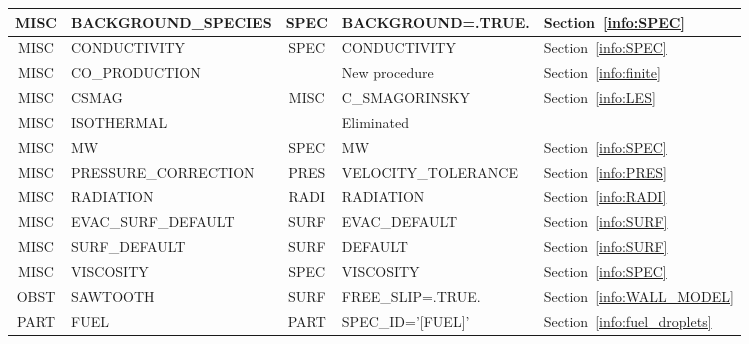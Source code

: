 \documentclass[11pt]{book}
\begin{document}
\begin{table}
\begin{tabular}{@{\extracolsep{\fill}}|c|l|c|l|l|}
{\ct MISC}    & {\ct BACKGROUND\_SPECIES}           &  {\ct SPEC}  & {\ct BACKGROUND=.TRUE.}                     & Section~\ref{info:SPEC}                  \\ \hline
{\ct MISC}    & {\ct CONDUCTIVITY}                  &  {\ct SPEC}  & {\ct CONDUCTIVITY}                          & Section~\ref{info:SPEC}                  \\ \hline
{\ct MISC}    & {\ct CO\_PRODUCTION}                &              & New procedure                               & Section~\ref{info:finite}                \\ \hline
{\ct MISC}    & {\ct CSMAG}                         &  {\ct MISC}  & {\ct C\_SMAGORINSKY}                        & Section~\ref{info:LES}                   \\ \hline
{\ct MISC}    & {\ct ISOTHERMAL}                    &              & Eliminated                                  &                                          \\ \hline
{\ct MISC}    & {\ct MW}                            &  {\ct SPEC}  & {\ct MW}                                    & Section~\ref{info:SPEC}                  \\ \hline
{\ct MISC}    & {\ct PRESSURE\_CORRECTION}          &  {\ct PRES}  & {\ct VELOCITY\_TOLERANCE}                   & Section~\ref{info:PRES}                  \\ \hline
{\ct MISC}    & {\ct RADIATION}                     &  {\ct RADI}  & {\ct RADIATION}                             & Section~\ref{info:RADI}                  \\ \hline
{\ct MISC}    & {\ct EVAC\_SURF\_DEFAULT}           &  {\ct SURF}  & {\ct EVAC\_DEFAULT}                         & Section~\ref{info:SURF}                  \\ \hline
{\ct MISC}    & {\ct SURF\_DEFAULT}                 &  {\ct SURF}  & {\ct DEFAULT}                               & Section~\ref{info:SURF}                  \\ \hline
{\ct MISC}    & {\ct VISCOSITY}                     &  {\ct SPEC}  &  {\ct VISCOSITY}                            & Section~\ref{info:SPEC}                  \\ \hline
{\ct OBST}    & {\ct SAWTOOTH}                      &  {\ct SURF}  & {\ct FREE\_SLIP=.TRUE.}                     & Section~\ref{info:WALL_MODEL}            \\ \hline
{\ct PART}    & {\ct FUEL}                          &  {\ct PART}  & {\ct SPEC\_ID='[FUEL]'}                     & Section~\ref{info:fuel_droplets}         \\ \hline

\end{tabular}
\end{table}
\end{document}
